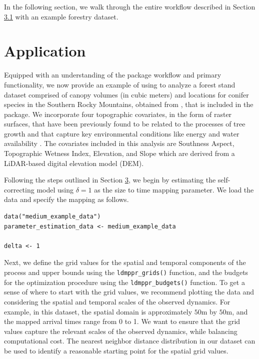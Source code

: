 In the following section, we walk through the entire workflow described
in Section \hyperref[workflow]{3.1} with an example forestry dataset.

\section{Application}\label{sec:application}

Equipped with an understanding of the package workflow and primary
functionality, we now provide an example of using  to
analyze a forest stand dataset comprised of canopy volumes (in cubic
meters) and locations for conifer species in the Southern Rocky
Mountains, obtained from \citet{drewDataBayesianRecord2024}, that is included
in the package. We incorporate four topographic covariates, in the form
of raster surfaces, that have been previously found to be related to the
processes of tree growth and that capture key environmental conditions
like energy and water availability \citep{drewBayesianRecordLinkage2025}. The
covariates included in this analysis are Southness Aspect, Topographic
Wetness Index, Elevation, and Slope which are derived from a LiDAR-based
digital elevation model (DEM).

Following the steps outlined in Section \hyperref[sec:package]{3}, we begin by
estimating the self-correcting model using \(\delta=1\) as the size to
time mapping parameter. We load the data and specify the mapping as follows.

\begin{verbatim}
data("medium_example_data")
parameter_estimation_data <- medium_example_data 

delta <- 1
\end{verbatim}

{Next, we define the grid values for the spatial and temporal components
of the process and upper bounds using the \texttt{ldmppr\_grids()} function, and the budgets for the optimization procedure using the \texttt{ldmppr\_budgets()} function. To get a sense of where to start with the grid values, we recommend plotting the data and considering the spatial and temporal scales of the observed dynamics. For example, in this dataset, the spatial domain is approximately \(50\)m by \(50\)m, and the mapped arrival times range from 0 to 1. We want to ensure that the grid values capture the relevant scales of the observed dynamics, while balancing computational cost. The nearest neighbor distance distribution in our dataset can be used to identify a reasonable starting point for the spatial grid values.}

